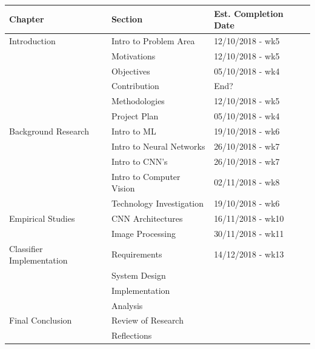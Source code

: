 \documentclass[12pt]{report}
\begin{document}
\begin{tabular}{|l|l|l|}
\hline
Chapter                   & Section                  & Est. Completion Date \\ \hline
Introduction              & Intro to Problem Area    & 12/10/2018 - wk5     \\ \hline
                          & Motivations              & 12/10/2018 - wk5     \\ \hline
                          & Objectives               & 05/10/2018 - wk4     \\ \hline
                          & Contribution             & End?                 \\ \hline
                          & Methodologies            & 12/10/2018 - wk5     \\ \hline
                          & Project Plan             & 05/10/2018 - wk4     \\ \hline
Background Research       & Intro to ML              & 19/10/2018 - wk6     \\ \hline
                          & Intro to Neural Networks & 26/10/2018 - wk7     \\ \hline
                          & Intro to CNN's           & 26/10/2018 - wk7     \\ \hline
                          & Intro to Computer Vision & 02/11/2018 - wk8     \\ \hline
                          & Technology Investigation & 19/10/2018 - wk6     \\ \hline
Empirical Studies         & CNN Architectures        & 16/11/2018 - wk10    \\ \hline
                          & Image Processing         & 30/11/2018 - wk11    \\ \hline                   
Classifier Implementation & Requirements             & 14/12/2018 - wk13    \\ \hline
                          & System Design            &                      \\ \hline  
                          & Implementation           &                      \\ \hline
                          & Analysis                 &                      \\ \hline           
Final Conclusion          & Review of Research       &                      \\ \hline
                          & Reflections              &                      \\ \hline                          
\end{tabular}
\end{document}
